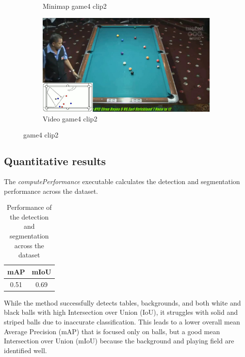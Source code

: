 \begin{figure}[H]
\begin{subfigure}[b]{0.48\textwidth}
    	\caption{Minimap game4 clip2}
    	\label{fig: game4_clip2_minimap}
    \end{subfigure}
    \begin{subfigure}[b]{0.48\textwidth}
    	\centering
    	\includegraphics[width=\textwidth]{images/Video/game4_clip2_video.jpg}
    	\caption{Video game4 clip2}
    	\label{fig: game1_clip1_video}
    \end{subfigure}
    
	\caption{game4 clip2}
\end{figure}


\subsection{Quantitative results}
The \textit{computePerformance} executable calculates the detection and segmentation performance across the dataset.
\begin{table}[H]
	\centering
    \begin{tabular}{|c|c|}
        \hline
        mAP & mIoU \\
        \hline
        0.51 & 0.69 \\
        \hline
    \end{tabular}
    \caption{Performance of the detection and segmentation across the dataset}
    \label{tab: performance across dataset}
\end{table}
While the method successfully detects tables, backgrounds, and both white and black balls with high Intersection
over Union (IoU), it struggles with solid and striped balls due to inaccurate classification.
This leads to a lower overall mean Average Precision (mAP) that is focused only on balls,
but a good mean Intersection over Union (mIoU) because the background and playing field are identified well.